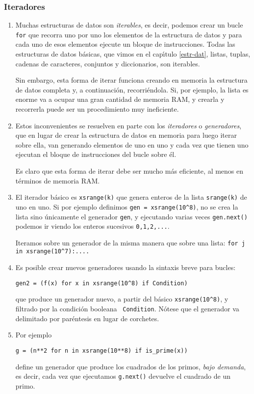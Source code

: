 \subsubsection{Iteradores}\label{iter}
\begin{enumerate}
\item Muchas estructuras de datos son {\itshape iterables}, es decir, podemos
crear un bucle \lstinline|for| que recorra uno por uno los elementos de la
estructura
de datos y para cada uno de esos elementos ejecute un bloque de instrucciones.
Todas las estructuras de datos b\'asicas, que vimos en el cap\'{\i}tulo
\ref{estr-dat}, listas, tuplas, cadenas de caracteres, conjuntos y diccionarios,
son iterables. 

Sin embargo, esta forma de iterar funciona creando en memoria la estructura de
datos completa y, a continuaci\'on, 
recorri\'endola. Si, por ejemplo,  la lista es enorme va a ocupar una gran
cantidad de memoria RAM, y crearla y recorrerla puede ser un procedimiento muy
ineficiente.

\item Estos inconvenientes se resuelven en parte con los {\itshape iteradores} o
{\itshape generadores}, que en lugar de crear la estructura de datos en memoria
para luego iterar sobre ella,  van generando elementos de uno en uno y cada vez
que tienen uno ejecutan el bloque de instrucciones del bucle sobre \'el. 

Es claro que esta forma de iterar debe ser mucho m\'as eficiente, al menos en
t\'erminos de memoria RAM. 


\item  El iterador b\'asico  es \lstinline|xsrange(k)| que genera enteros de la
lista
\lstinline|srange(k)| de uno en uno. Si por ejemplo definimos %
\lstinline|gen = xsrange(10^8)|,  no se crea la lista sino \'unicamente el
generador 
\lstinline|gen|, y
ejecutando varias veces \lstinline|gen.next()| podemos ir viendo  los enteros
sucesivos {\tt 0,1,2,...}. 

 
 Iteramos sobre un generador de la misma manera que sobre una lista: %
 \lstinline|for j in xsrange(10^7):....|
 
 \item \label{iter2}Es posible crear nuevos generadores usando la sintaxis
breve para bucles:
 \begin{lstlisting}[numbers=none]
 gen2 = (f(x) for x in xsrange(10^8) if Condition)
 \end{lstlisting}
\noindent que produce un generador nuevo, a partir del b\'asico 
\lstinline|xsrange(10^8)|, y filtrado por la condici\'on booleana {\tt
Condition}.
N\'otese
que el generador va delimitado por par\'entesis en lugar de corchetes. 
 
\item Por ejemplo

\begin{lstlisting}
g = (n**2 for n in xsrange(10**8) if is_prime(x))
\end{lstlisting}
\noindent define un generador que produce los cuadrados de los primos, {\itshape bajo demanda}, es decir, cada vez que ejecutamos \lstinline|g.next()| devuelve el cuadrado de un primo.  


 \end{enumerate}
